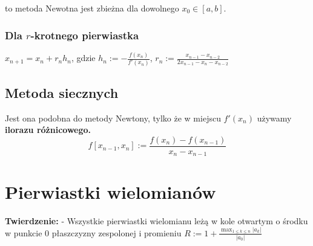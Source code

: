 \documentclass{article}
\begin{document}
\begin{minipage}[t]{.33\textwidth}
  to metoda Newotna jest zbieżna dla dowolnego $x_0 \in [a,b]$.
 \subsubsection*{Dla $r$-krotnego pierwiastka}
 $x_{n+1} = x_n + r_nh_n$, gdzie $h_n := -\frac{f(x_n)}{f'(x_n)}$, $r_n := \frac{x_{n-1}-x_{n-2}}{2x_{n-1}-x_n-x_{n-2}}$
\subsection*{Metoda siecznych}
Jest ona podobna do  metody Newtony, tylko że w miejscu $f'(x_n)$ używamy \textbf{ilorazu różnicowego.}
\begin{equation*}
    f[x_{n-1},x_n] := \frac{f(x_n)-f(x_{n-1})}{x_n - x_{n-1}}
\end{equation*}
\section*{Pierwiastki wielomianów}
\textbf{Twierdzenie:\;} - Wszystkie pierwiastki wielomianu leżą w kole otwartym o środku w punkcie 0 płaszczyzny zespolonej i promieniu $R := 1 + \frac{\max_{1 \leqslant k \leqslant n}|a_k|}{|a_0|}$

\end{minipage}
\end{document}
